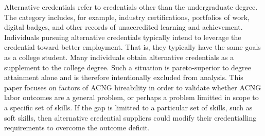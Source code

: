 \documentclass[review]{elsarticle}
\begin{document}
Alternative credentials refer to credentials other than the undergraduate degree\cite{brown2017complex}.
The category includes, for example,
industry certifications,
portfolios of work,
digital badges, and other records of unaccredited learning and achievement.
Individuals pursuing alternative credentials typically intend to leverage the credential toward better employment.
That is, they typically have the same goals as a college student.
Many individuals obtain alternative credentials as a supplement to the college degree.
Such a situation is pareto-superior to degree attainment alone and is therefore intentionally excluded from analysis.
This paper focuses on factors of ACNG hireability in order to validate whether ACNG labor outcomes are a general problem,
or perhaps a problem limitted in scope to a specific set of skills.
If the gap is limitted to a particular set of skills, such as soft skills, then alternative credential suppliers could modify their credentialling requirements to overcome the outcome deficit.




\end{document}
